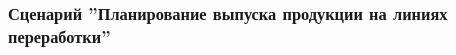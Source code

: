 \begin{enumerate}

\end{enumerate}

\subsubsection{Сценарий ''Планирование выпуска продукции на линиях переработки''}
\label{bp:plan_3b}


